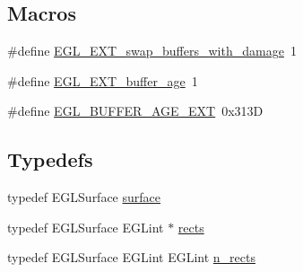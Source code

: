\subsection*{Macros}
\begin{DoxyCompactItemize}
\item 
\#define \hyperlink{simple-egl_8cpp_a083d37f289b99270e0391419178d458f}{E\+G\+L\+\_\+\+E\+X\+T\+\_\+swap\+\_\+buffers\+\_\+with\+\_\+damage}~1
\item 
\#define \hyperlink{simple-egl_8cpp_a0792e3d8b2bc978f95917a234b0c81df}{E\+G\+L\+\_\+\+E\+X\+T\+\_\+buffer\+\_\+age}~1
\item 
\#define \hyperlink{simple-egl_8cpp_a7045d8a6b4857f268a62fab2de2021fd}{E\+G\+L\+\_\+\+B\+U\+F\+F\+E\+R\+\_\+\+A\+G\+E\+\_\+\+E\+XT}~0x313D
\end{DoxyCompactItemize}
\subsection*{Typedefs}
\begin{DoxyCompactItemize}
\item 
typedef E\+G\+L\+Surface \hyperlink{simple-egl_8cpp_a0720952aa1caded45b5bcdce589663a9}{surface}
\item 
typedef E\+G\+L\+Surface E\+G\+Lint $\ast$ \hyperlink{simple-egl_8cpp_a56616f7ca3fc53c0da41d05de9330b11}{rects}
\item 
typedef E\+G\+L\+Surface E\+G\+Lint E\+G\+Lint \hyperlink{simple-egl_8cpp_aa6a11810244355f89e6c4961b9dd3b53}{n\+\_\+rects}
\end{DoxyCompactItemize}
